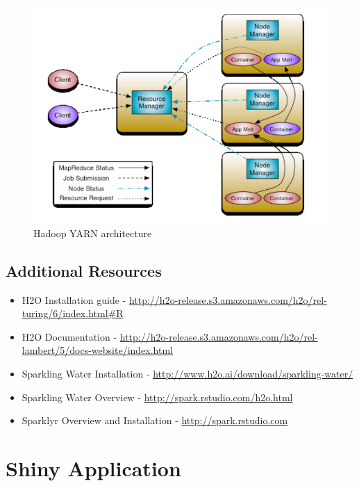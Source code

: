\documentclass[12pt,twoside]{amherstthesis}
\begin{document}
  \begin{figure}[htbp]
  \centering
  \includegraphics[scale = 0.5,angle = 0]{figure/yarn.png}
  \caption[Hadoop YARN architecture]{\normalsize{Hadoop YARN architecture}}
  \label{fig:Hyarn}
  \end{figure}
  
  \section{Additional Resources}\label{additional-resources}
  
  \begin{itemize}
  \item
    H2O Installation guide -
    \url{http://h2o-release.s3.amazonaws.com/h2o/rel-turing/6/index.html\#R}
  \item
    H2O Documentation -
    \url{http://h2o-release.s3.amazonaws.com/h2o/rel-lambert/5/docs-website/index.html}
  \item
    Sparkling Water Installation -
    \url{http://www.h2o.ai/download/sparkling-water/}
  \item
    Sparkling Water Overview - \url{http://spark.rstudio.com/h2o.html}
  \item
    Sparklyr Overview and Installation - \url{http://spark.rstudio.com}
  \end{itemize}
  
  \chapter{Shiny Application}\label{shiny-application}
  
\end{document}
